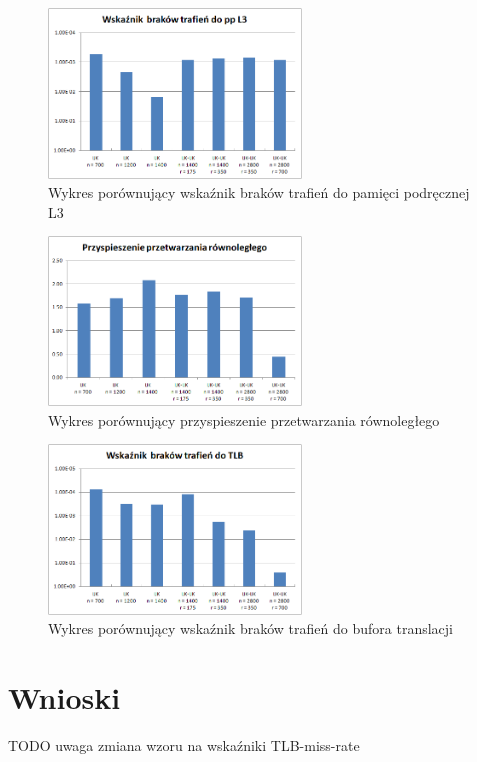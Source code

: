 \documentclass[12pt,a4paper]{article}
\begin{document}
\begin{figure}[H]
  \centering
    \includegraphics[width=0.60\textwidth]{../Results/charts/L3_miss.png}
    \caption{Wykres porównujący wskaźnik braków trafień do pamięci podręcznej L3}
\end{figure}


\begin{figure}[H]
  \centering
    \includegraphics[width=0.60\textwidth]{../Results/charts/ppr.png}
    \caption{Wykres porównujący przyspieszenie przetwarzania równoległego}
\end{figure}


\begin{figure}[H]
  \centering
    \includegraphics[width=0.60\textwidth]{../Results/charts/TLB_miss.png}
    \caption{Wykres porównujący wskaźnik braków trafień do bufora translacji}
\end{figure}

\section{Wnioski}
{\huge TODO uwaga zmiana wzoru na wskaźniki TLB-miss-rate}\\
\end{document}
